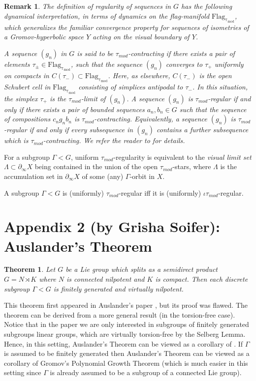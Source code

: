 \documentclass[12pt]{article}
\theoremstyle{boldplain}
\newtheorem{thm}[equation]{Theorem}
\theoremstyle{bolddefinition}
\newtheorem{rem}[equation]{Remark}
\numberwithin{equation}{section}
\def\Ga{\Gamma}
\def\La{\Lambda}
\def\Flagt{\operatorname{Flag_{\tau_{mod}}}}
\def\geo{\partial_{\infty}}
\def\taumod{\tau_{mod}}
\begin{document}
\begin{rem}
{The definition of regularity of sequences in $G$ has the following dynamical interpretation, in terms of dynamics on the flag-manifold $\Flagt$, which generalizes the familiar convergence property for sequences of isometries of a Gromov-hyperbolic space $Y$ acting on the visual boundary of $Y$.} 

{A sequence $(g_n)$ in $G$ is said to be {\em $\taumod$-contracting} if there exists a pair of elements $\tau_\pm \in \Flagt$, such that the sequence $(g_n)$ converges to $\tau_+$ uniformly on compacts in $C(\tau_-)\subset \Flagt$. Here, as elsewhere, $C(\tau_-)$ is the open Schubert cell in $\Flagt$ consisting of simplices antipodal to $\tau_-$. In this situation, the simplex $\tau_+$ is the $\taumod$-limit of $(g_n)$. 
A sequence $(g_n)$ is $\taumod$-regular if and only if there exists a pair of bounded sequences $a_n, b_n\in G$ such that the sequence of compositions $c_n g_n b_n$ is $\taumod$-contracting. Equivalently, a sequence $(g_n)$ is $\taumod$-regular if and only if every subsequence in $(g_n)$ contains a further subsequence which is $\taumod$-contracting. We refer the reader to \cite{anolec} for details.}
\end{rem}

For a subgroup $\Ga<G$, uniform $\taumod$-regularity is equivalent to 
the {\em visual limit set} $\La\subset\geo X$ being contained 
in the union of the open $\taumod$-stars, where $\La$ is the accumulation set in $\geo X$ 
of some (any) $\Ga$-orbit in $X$. 

A subgroup $\Ga<G$ is (uniformly) $\taumod$-regular iff it is 
(uniformly) $\iota\taumod$-regular. 




\section{Appendix 2 (by Grisha Soifer): Auslander's Theorem}\label{sec:Auslander}


\begin{thm} \label{thm:auslander}
Let $G$ be a Lie group which splits as a semidirect product 
$G= N\rtimes K$ where $N$ is connected nilpotent and $K$ is compact. 
Then each discrete subgroup $\Ga< G$ is finitely generated and virtually nilpotent. 
\end{thm}
\proof This theorem first appeared in Auslander's paper \cite{Au1}, but its proof was flawed. The theorem can be derived  from a more general result \cite{BK} (in the torsion-free case). 
Notice that in the paper we are only interested in subgroups of finitely generated subgroups linear groups, which are virtually torsion-free by the Selberg Lemma. Hence, in this setting, Auslander's Theorem can be viewed as a corollary of \cite{BK}.  If $\Ga$ is assumed to be finitely generated then 
Auslander's Theorem can be viewed as a corollary of Gromov's Polynomial Growth Theorem (which is much easier in this setting since $\Ga$ 
is already assumed to be a subgroup of a connected Lie group). 
\end{document}
